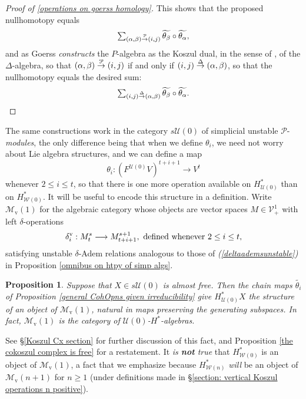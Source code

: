 \documentclass[11pt]{amsart} \renewcommand{\baselinestretch}{1.2}
\theoremstyle{plain}
\newtheorem{prop}[thm]{Proposition}
\theoremstyle{definition}
\renewcommand{\to}{\longrightarrow}
\newcommand{\calU}{\mathcal{U}}
\newcommand{\calP}{\mathcal{P}}
\newcommand{\calV}{\mathcal{V}}
\newcommand{\calw}{\mathcal{W}}
\newcommand{\calMv}{\mathcal{M}\dver}
\newcommand{\Palg}{{\calP}}
\newcommand{\vect}[2]{\calV^{#1}_{#2}}
\newcommand{\produces}[3]{#3:#1\sim #2}
\renewcommand{\produces}[3]{#1\rightarrow_{#3} #2}%
\renewcommand{\produces}[3]{#1\overset{\smash{#3}}{\rightarrow} #2}%
\newcommand{\uver}{^\mathrm{v}}
\newcommand{\dver}{_\mathrm{v}}
\newcommand{\deltav}{\delta\uver}
\begin{document}
\begin{Cohomology Operations for W and U}
\begin{proof}[Proof of \ref{operations on goerss homology}]
This shows that the proposed nullhomotopy equals  
\[\textstyle\sum_{\produces{(\alpha,\beta)}{(i,j)}{\Palg}}\widetilde{\theta_\beta}\circ\widetilde{\theta_\alpha},\]
 and as Goerss \cite{MR1089001} \emph{constructs} the $P$-algebra as the Koszul dual, in the sense of \cite{PriddyKoszul.pdf}, of the $\Delta$-algebra, so that $\produces{(\alpha,\beta)}{(i,j)}{\Palg}$ if and only if $\produces{(i,j)}{(\alpha,\beta)}{\Delta}$, so that the nullhomotopy equals the desired sum:
\[\textstyle\sum_{\produces{(i,j)}{(\alpha,\beta)}{\Delta}}\widetilde{\theta_\beta}\circ\widetilde{\theta_\alpha}.\qedhere\]
\end{proof}
The same constructions work in the category $s\calU(0)$ of simplicial unstable $\Palg$-\emph{modules}, the only difference being that when we define $\theta_i$, we need not worry about Lie algebra structures, and we can define a map
\[\theta_i:(F^{\calU(0)}V)^{t+i+1}\to V^t\]
whenever $2\leq i\leq t$, so that there is one more operation available on $H^*_{\calU(0)}$ than on $H^*_{\calw(0)}$. It will be useful to encode this structure in a definition. Write $\calMv(1)$ for the algebraic category whose objects are vector spaces $M\in\vect{1}{+}$ with left $\delta$-operations
\[\deltav_i:M^{s}_t\to M^{s+1}_{t+i+1},\textup{ defined whenever $2\leq i\leq t$,}\]
satisfying unstable $\delta$-Adem relations analogous to those of \emph{(\ref{deltaademsunstable})} in Proposition \ref{omnibus on htpy of simp algs}.
\begin{prop}
\label{operations on untable P homology}
Suppose that $X\in s\calU(0)$ is almost free. Then the chain maps $\widetilde{\theta_i}$ of Proposition \ref{general CohOpns given irreducibility} give $H^*_{\calU(0)}X$ the structure of an object of $\calMv(1)$, natural in maps preserving the generating subspaces. In fact, $\calMv(1)$ is the category of $\calU(0)$-$H^*$-algebras.
\end{prop}
\noindent See \S\ref{Koszul Cx section} for further discussion of this fact, and Proposition \ref{the cokoszul complex is free} for a restatement. It \emph{is \textbf{not} true} that $H^*_{\calw(0)}$ is an object of $\calMv(1)$, a fact that we emphasize because $H^*_{\calw(n)}$ \emph{will} be an object of $\calMv(n+1)$ for $n\geq 1$ (under definitions made in \S\ref{section: vertical Koszul operations n positive}).


\end{Cohomology Operations for W and U}
\end{document}

